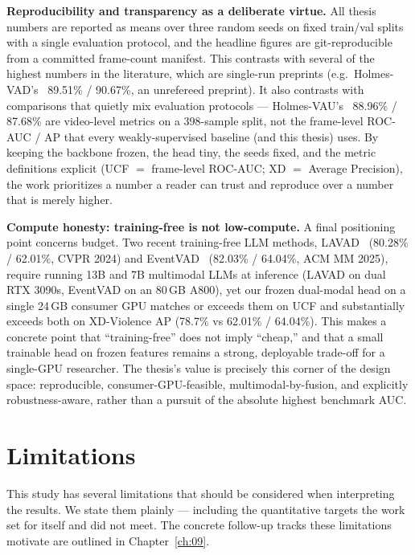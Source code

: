 \medskip\noindent\textbf{Reproducibility and transparency as a deliberate virtue.}
All thesis numbers are reported as means over three random seeds on fixed
train/val splits with a single evaluation protocol, and the headline figures are
git-reproducible from a committed frame-count manifest. This contrasts with
several of the highest numbers in the literature, which are single-run preprints
(e.g.\ Holmes-VAD's~\cite{zhang2024holmesvad} 89.51\% / 90.67\%, an unrefereed
preprint).
It also contrasts with comparisons that quietly mix evaluation protocols ---
Holmes-VAU's~\cite{zhang2025holmesvau} 88.96\% / 87.68\% are video-level
metrics on a 398-sample split,
not the frame-level ROC-AUC / AP that every weakly-supervised baseline (and this
thesis) uses. By keeping the backbone frozen, the head tiny, the seeds fixed,
and the metric definitions explicit (UCF $=$ frame-level ROC-AUC; XD $=$ Average
Precision), the work prioritizes a number a reader can trust and reproduce over
a number that is merely higher.

\medskip\noindent\textbf{Compute honesty: training-free is not low-compute.}
A final positioning point concerns budget. Two recent training-free LLM methods,
LAVAD~\cite{zanella2024lavad} (80.28\% / 62.01\%, CVPR 2024) and
EventVAD~\cite{shao2025eventvad} (82.03\% / 64.04\%, ACM MM
2025), require running 13B and 7B multimodal LLMs at inference (LAVAD on dual
RTX 3090s, EventVAD on an 80\,GB A800), yet our frozen dual-modal head on a single
24\,GB consumer GPU matches or exceeds them on UCF and substantially exceeds both
on XD-Violence AP (78.7\% vs 62.01\% / 64.04\%). This makes a concrete point that
``training-free'' does not imply ``cheap,'' and that a small trainable head on
frozen features remains a strong, deployable trade-off for a single-GPU
researcher. The thesis's value is precisely this corner of the design space:
reproducible, consumer-GPU-feasible, multimodal-by-fusion, and explicitly
robustness-aware, rather than a pursuit of the absolute highest benchmark AUC.

\section{Limitations}
\label{sec:disc-limitations}

This study has several limitations that should be considered when interpreting
the results. We state them plainly --- including the quantitative targets the
work set for itself and did not meet. The concrete follow-up tracks these
limitations motivate are outlined in Chapter~\ref{ch:09}.

